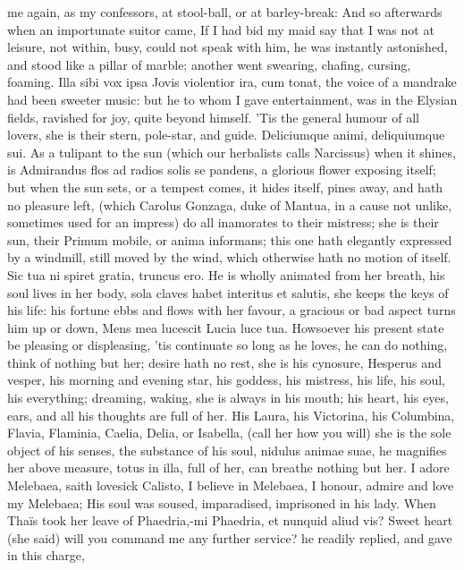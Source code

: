 me again, as my confessors, at stool-ball, or at barley-break: And so
afterwards when an importunate suitor came, If I had bid my maid
say that I was not at leisure, not within, busy, could not speak with
him, he was instantly astonished, and stood like a pillar of marble;
another went swearing, chafing, cursing, foaming. Illa sibi vox
ipsa Jovis violentior ira, cum tonat, \etc{} the voice of a mandrake had
been sweeter music: but he to whom I gave entertainment, was in the
Elysian fields, ravished for joy, quite beyond himself. 'Tis the
general humour of all lovers, she is their stern, pole-star, and guide.
Deliciumque animi, deliquiumque sui. As a tulipant to the sun
(which our herbalists calls Narcissus) when it shines, is Admirandus
flos ad radios solis se pandens, a glorious flower exposing itself;
but when the sun sets, or a tempest comes, it hides itself, pines
away, and hath no pleasure left, (which Carolus Gonzaga, duke of
Mantua, in a cause not unlike, sometimes used for an impress) do all
inamorates to their mistress; she is their sun, their Primum mobile, or
anima informans; this one hath elegantly expressed by a windmill,
still moved by the wind, which otherwise hath no motion of itself. Sic
tua ni spiret gratia, truncus ero. He is wholly animated from her
breath, his soul lives in her body, sola claves habet interitus
et salutis, she keeps the keys of his life: his fortune ebbs and flows
with her favour, a gracious or bad aspect turns him up or down, Mens
mea lucescit Lucia luce tua. Howsoever his present state be pleasing or
displeasing, 'tis continuate so long as he loves, he can do
nothing, think of nothing but her; desire hath no rest, she is his
cynosure, Hesperus and vesper, his morning and evening star, his
goddess, his mistress, his life, his soul, his everything; dreaming,
waking, she is always in his mouth; his heart, his eyes, ears, and all
his thoughts are full of her. His Laura, his Victorina, his Columbina,
Flavia, Flaminia, Caelia, Delia, or Isabella, (call her how you will)
she is the sole object of his senses, the substance of his soul,
nidulus animae suae, he magnifies her above measure, totus in illa,
full of her, can breathe nothing but her. I adore Melebaea, saith
lovesick Calisto, I believe in Melebaea, I honour, admire and
love my Melebaea; His soul was soused, imparadised, imprisoned in his
lady. When Thaïs took her leave of Phaedria,-mi Phaedria, et
nunquid aliud vis? Sweet heart (she said) will you command me any
further service? he readily replied, and gave in this charge,

